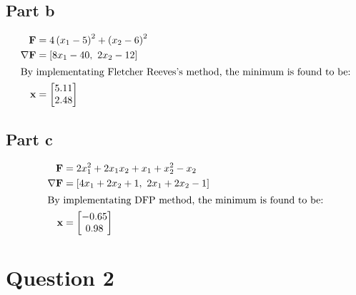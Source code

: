 \documentclass[a4paper,12pt]{article} %
\begin{document}
\subsection*{Part b}
\begin{align*}
    \mathbf{F} &= 4 \left(x_{1} - 5\right)^{2} + \left(x_{2} - 6\right)^{2} \\
    \nabla \mathbf{F}&= \left[ 8 x_{1} - 40, \  2 x_{2} - 12\right]\\
    \intertext{By implementating Fletcher Reeves's method, the minimum is found to be:}
    \mathbf{x} &= \left[\begin{matrix}5.11\\2.48\end{matrix}\right]
\end{align*}

\subsection*{Part c}
\begin{align*}
    \mathbf{F} &= 2 x_{1}^{2} + 2 x_{1} x_{2} + x_{1} + x_{2}^{2} - x_{2} \\
    \nabla \mathbf{F}&= \left[ 4 x_{1} + 2 x_{2} + 1, \  2 x_{1} + 2 x_{2} - 1\right]\\
    \intertext{By implementating DFP method, the minimum is found to be:}
    \mathbf{x} &= \left[\begin{matrix}-0.65\\0.98\end{matrix}\right]
\end{align*}
\newpage
\section*{\textbf{Question 2}}
\end{document}
